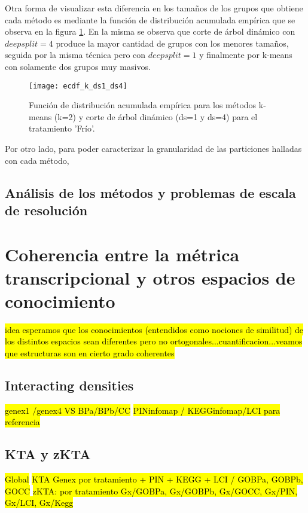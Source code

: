 Otra forma de visualizar esta diferencia en los tamaños de los grupos que obtiene cada método es mediante la función de distribución acumulada empírica que se observa en la figura \ref{fig:ecdf_k_ds1_ds4}. En la misma se observa que corte de árbol dinámico con $deepsplit=4$ produce la mayor cantidad de grupos con los menores tamaños, seguida por la misma técnica pero con $deepsplit=1$ y finalmente por k-means con solamente dos grupos muy masivos.
\begin{figure}[h]
    \centering
    \texttt{[image: ecdf\_k\_ds1\_ds4]}
    \caption{Función de distribución acumulada empírica para los métodos k-means (k=2) y corte de árbol dinámico (ds=1 y ds=4) para el tratamiento 'Frío'.}
    \label{fig:ecdf_k_ds1_ds4}
\end{figure}
Por otro lado, para poder caracterizar la granularidad de las particiones halladas con cada método, 

\subsection{Análisis de los métodos y problemas de escala de resolución}

\section{Coherencia entre la métrica transcripcional y otros espacios de conocimiento}
\hl{idea esperamos que los conocimientos (entendidos como nociones de similitud) de los distintos espacios sean diferentes pero no ortogonales...cuantificacion...veamos que estructuras son en cierto grado coherentes}
\subsection{Interacting densities}
\hl{genex1 /genex4  VS BPa/BPb/CC}
\hl{PINinfomap / KEGGinfomap/LCI para referencia}
\subsection{KTA y zKTA}
\hl{Global}
\hl{KTA Genex por tratamiento + PIN + KEGG + LCI / GOBPa, GOBPb, GOCC}
\hl{zKTA: por tratamiento Gx/GOBPa, Gx/GOBPb, Gx/GOCC, Gx/PIN, Gx/LCI, Gx/Kegg}
